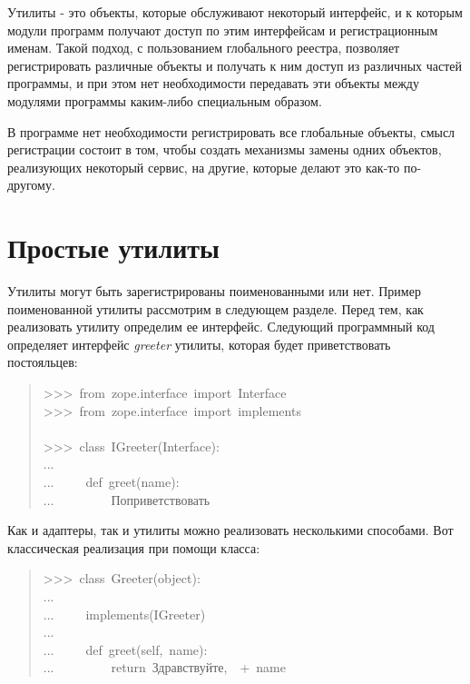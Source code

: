 \documentclass[14pt,a4paper,openany,twoside,final]{extbook}
\providecommand*{\DUroletitlereference}[1]{\textsl{#1}}
\begin{document}
Утилиты - это объекты, которые обслуживают некоторый интерфейс, и к
которым модули программ получают доступ по этим интерфейсам и
регистрационным именам.  Такой подход, с пользованием глобального
реестра, позволяет регистрировать различные объекты и получать к ним
доступ из различных частей программы, и при этом нет необходимости
передавать эти объекты между модулями программы каким-либо специальным
образом.

В программе нет необходимости регистрировать все глобальные объекты,
смысл регистрации состоит в том, чтобы создать механизмы замены одних
объектов, реализующих некоторый сервис, на другие, которые делают это
как-то по-другому.


\section{Простые утилиты%
  \label{id41}%
}

Утилиты могут быть зарегистрированы поименованными или нет.  Пример
поименованной утилиты рассмотрим в следующем разделе.  Перед тем, как
реализовать утилиту определим ее интерфейс.  Следующий программный код
определяет интерфейс \DUroletitlereference{greeter} утилиты, которая будет приветствовать
постояльцев:

\begin{quote}{\ttfamily \raggedright \noindent
>{}>{}>~from~zope.interface~import~Interface\\
>{}>{}>~from~zope.interface~import~implements\\
~\\
>{}>{}>~class~IGreeter(Interface):\\
...\\
...~~~~~def~greet(name):\\
...~~~~~~~~~\textquotedbl{}\textquotedbl{}\textquotedbl{}Поприветствовать\textquotedbl{}\textquotedbl{}\textquotedbl{}
}
\end{quote}

Как и адаптеры, так и утилиты можно реализовать несколькими
способами.  Вот классическая реализация при помощи класса:

\begin{quote}{\ttfamily \raggedright \noindent
>{}>{}>~class~Greeter(object):\\
...\\
...~~~~~implements(IGreeter)\\
...\\
...~~~~~def~greet(self,~name):\\
...~~~~~~~~~return~\textquotedbl{}Здравствуйте,~\textquotedbl{}~+~name
}
\end{quote}
\end{document}
